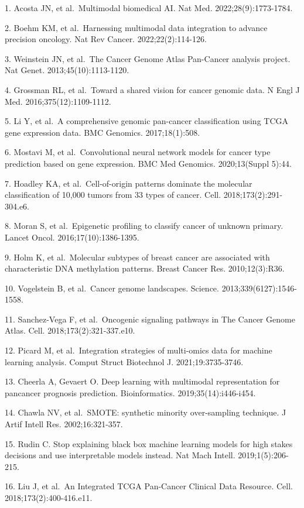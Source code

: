 1. Acosta JN, et al.~Multimodal biomedical AI. Nat Med.
2022;28(9):1773-1784.

2. Boehm KM, et al.~Harnessing multimodal data integration to advance
precision oncology. Nat Rev Cancer. 2022;22(2):114-126.

3. Weinstein JN, et al.~The Cancer Genome Atlas Pan-Cancer analysis
project. Nat Genet. 2013;45(10):1113-1120.

4. Grossman RL, et al.~Toward a shared vision for cancer genomic data. N
Engl J Med. 2016;375(12):1109-1112.

5. Li Y, et al.~A comprehensive genomic pan-cancer classification using
TCGA gene expression data. BMC Genomics. 2017;18(1):508.

6. Mostavi M, et al.~Convolutional neural network models for cancer type
prediction based on gene expression. BMC Med Genomics. 2020;13(Suppl
5):44.

7. Hoadley KA, et al.~Cell-of-origin patterns dominate the molecular
classification of 10,000 tumors from 33 types of cancer. Cell.
2018;173(2):291-304.e6.

8. Moran S, et al.~Epigenetic profiling to classify cancer of unknown
primary. Lancet Oncol. 2016;17(10):1386-1395.

9. Holm K, et al.~Molecular subtypes of breast cancer are associated
with characteristic DNA methylation patterns. Breast Cancer Res.
2010;12(3):R36.

10. Vogelstein B, et al.~Cancer genome landscapes. Science.
2013;339(6127):1546-1558.

11. Sanchez-Vega F, et al.~Oncogenic signaling pathways in The Cancer
Genome Atlas. Cell. 2018;173(2):321-337.e10.

12. Picard M, et al.~Integration strategies of multi-omics data for
machine learning analysis. Comput Struct Biotechnol J.
2021;19:3735-3746.

13. Cheerla A, Gevaert O. Deep learning with multimodal representation
for pancancer prognosis prediction. Bioinformatics.
2019;35(14):i446-i454.

14. Chawla NV, et al.~SMOTE: synthetic minority over-sampling technique.
J Artif Intell Res. 2002;16:321-357.

15. Rudin C. Stop explaining black box machine learning models for high
stakes decisions and use interpretable models instead. Nat Mach Intell.
2019;1(5):206-215.

16. Liu J, et al.~An Integrated TCGA Pan-Cancer Clinical Data Resource.
Cell. 2018;173(2):400-416.e11.

